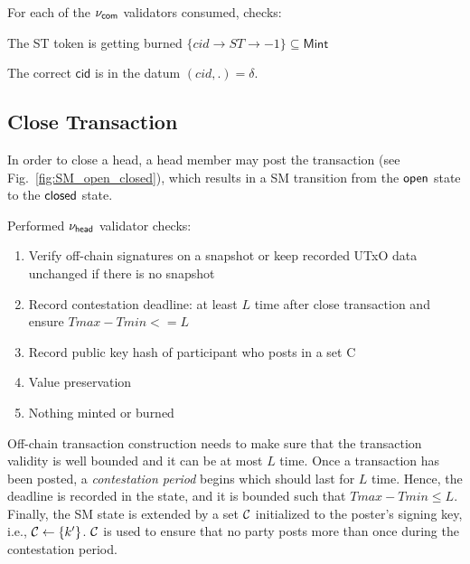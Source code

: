 For each of the $\nu_\mathsf{com}$ validators consumed, checks:
\begin{menumerate}
  \item The ST token is getting burned $\{cid \rightarrow ST \rightarrow -1\} \subseteq \mathsf{Mint}$
  \item The correct $\mathsf{cid}$ is in the datum $(cid,.) = \delta$.
\end{menumerate}

\subsection{Close Transaction} 

In order to close a head, a head
member may post the \mtxClose{} transaction (see
Fig.~\ref{fig:SM_open_closed}), which results in a SM transition
from the $\mathsf{open}$ state to the $\mathsf{closed}$ state.
\newline

Performed $\nu_\mathsf{head}$ validator checks:

\begin{enumerate}
  \item Verify off-chain signatures on a snapshot or keep recorded UTxO data unchanged if there is no snapshot 
  \item Record contestation deadline: at least $L$ time after close transaction and ensure $Tmax - Tmin <= L$ 
  \item Record public key hash of participant who posts in a set C
  \item Value preservation
  \item Nothing minted or burned
\end{enumerate}

Off-chain transaction construction needs to make sure that the transaction validity is well bounded and it can be at most $L$ time.
\newline
\newline
Once a \mtxClose{} transaction has been posted, a \emph{contestation period}
begins which should last for $L$ time. Hence, the deadline is recorded in the state, and it is bounded such that $Tmax - Tmin \leq L$.
\newline
\newline
Finally, the SM state is extended by a set $\mathcal C$
initialized to the poster's signing key, i.e.,
$\mathcal C \gets \{k'\}$.   $\mathcal C$ is used to ensure that no party
posts more than once during the contestation period.





